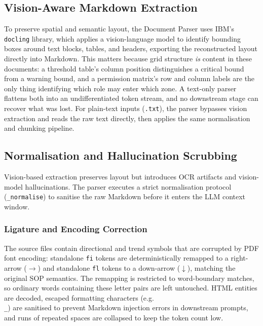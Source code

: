 \documentclass[11pt]{article}
\begin{document}
\subsection{Vision-Aware Markdown Extraction}
To preserve spatial and semantic layout, the Document Parser uses IBM's
\texttt{docling} library, which applies a vision-language model to identify
bounding boxes around text blocks, tables, and headers, exporting the
reconstructed layout directly into Markdown. This matters because grid structure
\emph{is} content in these documents: a threshold table's column position
distinguishes a critical bound from a warning bound, and a permission matrix's
row and column labels are the only thing identifying which role may enter which
zone. A text-only parser flattens both into an undifferentiated token stream, and
no downstream stage can recover what was lost. For plain-text inputs (\texttt{.txt}), the parser bypasses vision
extraction and reads the raw text directly, then applies the same normalisation
and chunking pipeline.

\subsection{Normalisation and Hallucination Scrubbing}
Vision-based extraction preserves layout but introduces OCR artifacts and
vision-model hallucinations. The parser executes a strict normalisation protocol
(\texttt{\_normalise}) to sanitise the raw Markdown before it enters the LLM
context window.

\subsubsection{Ligature and Encoding Correction}
The source files contain directional and trend symbols that are corrupted by
PDF font encoding: standalone \texttt{fi} tokens are deterministically remapped
to a right-arrow ($\rightarrow$) and standalone \texttt{fl} tokens to a
down-arrow ($\downarrow$), matching the original SOP semantics. The remapping
is restricted to word-boundary matches, so ordinary words containing these
letter pairs are left untouched. HTML entities are decoded, escaped
formatting characters (e.g.\ \texttt{\\\_}) are sanitised to prevent Markdown
injection errors in downstream prompts, and runs of repeated spaces are
collapsed to keep the token count low.
\end{document}
